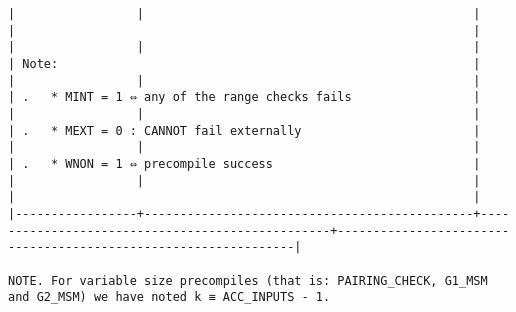 \documentclass[varwidth=\maxdimen,margin=0.5cm,multi={verbatim}]{standalone}
\begin{document}
\begin{verbatim}
|                 |                                              |                                                 |                                                                |
|                 |                                              |                                                 | Note:                                                          |
|                 |                                              |                                                 | .   * MINT = 1 ⇔ any of the range checks fails                 |
|                 |                                              |                                                 | .   * MEXT = 0 : CANNOT fail externally                        |
|                 |                                              |                                                 | .   * WNON = 1 ⇔ precompile success                            |
|                 |                                              |                                                 |                                                                |
|-----------------+----------------------------------------------+-------------------------------------------------+----------------------------------------------------------------|

NOTE. For variable size precompiles (that is: PAIRING_CHECK, G1_MSM and G2_MSM) we have noted k ≡ ACC_INPUTS - 1.
\end{verbatim}
\end{document}
